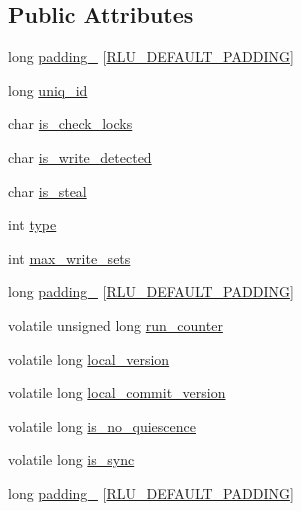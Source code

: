 \subsection*{Public Attributes}
\begin{DoxyCompactItemize}
\item 
long \hyperlink{structrlu__thread__data_a5a7d06054f8da7781b58e235d0c3ff2a}{padding\+\_} \mbox{[}\hyperlink{rlu_8h_a52e9bd0565eaf64830bc7e85dde5f5cb}{R\+L\+U\+\_\+\+D\+E\+F\+A\+U\+L\+T\+\_\+\+P\+A\+D\+D\+I\+NG}\mbox{]}
\item 
long \hyperlink{structrlu__thread__data_a25e80ec0edeca9833c8f862e024c3be1}{uniq\+\_\+id}
\item 
char \hyperlink{structrlu__thread__data_ae92b26446f5335b412fd81b49bed9a43}{is\+\_\+check\+\_\+locks}
\item 
char \hyperlink{structrlu__thread__data_a44a4f456fc8ac360eb58b711055ea1fe}{is\+\_\+write\+\_\+detected}
\item 
char \hyperlink{structrlu__thread__data_a53a0e2d43c35fcb4951b79f280ad992a}{is\+\_\+steal}
\item 
int \hyperlink{structrlu__thread__data_a3c6fda60f9fe062cf211b1f214999fb1}{type}
\item 
int \hyperlink{structrlu__thread__data_a8e1aa454552e3d76a007c8b1934e85a3}{max\+\_\+write\+\_\+sets}
\item 
long \hyperlink{structrlu__thread__data_a507495b36a9895a552ac4d6ff5af0ac5}{padding\+\_} \mbox{[}\hyperlink{rlu_8h_a52e9bd0565eaf64830bc7e85dde5f5cb}{R\+L\+U\+\_\+\+D\+E\+F\+A\+U\+L\+T\+\_\+\+P\+A\+D\+D\+I\+NG}\mbox{]}
\item 
volatile unsigned long \hyperlink{structrlu__thread__data_a24a65bd3d29cd124c6f17ab7ff99513c}{run\+\_\+counter}
\item 
volatile long \hyperlink{structrlu__thread__data_a5cfd4d999cc6716c89d94dd36760b438}{local\+\_\+version}
\item 
volatile long \hyperlink{structrlu__thread__data_afbfdf9a44213147761485025bcb7e5b6}{local\+\_\+commit\+\_\+version}
\item 
volatile long \hyperlink{structrlu__thread__data_ab3302a4de8e3c2b66060a520e29ce48d}{is\+\_\+no\+\_\+quiescence}
\item 
volatile long \hyperlink{structrlu__thread__data_a54621ad6a0876a5e5d386b5646d82616}{is\+\_\+sync}
\item 
long \hyperlink{structrlu__thread__data_a0f5fdf2d7b6d6065ff36503841689cd5}{padding\+\_} \mbox{[}\hyperlink{rlu_8h_a52e9bd0565eaf64830bc7e85dde5f5cb}{R\+L\+U\+\_\+\+D\+E\+F\+A\+U\+L\+T\+\_\+\+P\+A\+D\+D\+I\+NG}\mbox{]}

\end{DoxyCompactItemize}

